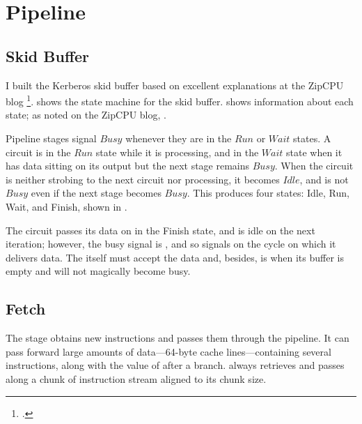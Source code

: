 \chapter{Pipeline}

\section{Skid Buffer}

I built the Kerberos skid buffer based on excellent explanations at the ZipCPU
blog \footcite{ZipCPU.Pipeline}.  
shows the state machine for the skid buffer.
 shows information about each state;
as noted on the ZipCPU blog, .



Pipeline stages signal $Busy$ whenever they are in the $Run$ or $Wait$ states.
A circuit is in the $Run$ state while it is processing, and in the $Wait$ state
when it has data sitting on its output but the next stage remains $Busy$.  When
the circuit is neither strobing to the next circuit nor processing, it becomes
$Idle$, and is not $Busy$ even if the next stage becomes $Busy$. This produces
four states:  Idle, Run, Wait, and Finish, shown in
.

The circuit passes its data on in the Finish state, and is idle on the next
iteration; however, the busy signal is , and so signals  on the cycle on which it
delivers data.  The  itself must accept the data and,
besides, is  when its buffer is empty and will not magically
become busy.



\section{Fetch}

The  stage obtains new instructions and passes them through
the pipeline.  It can pass forward large amounts of data—64-byte cache
lines—containing several instructions, along with the value of 
after a branch.   always retrieves and passes along a chunk
of instruction stream aligned to its chunk size.



